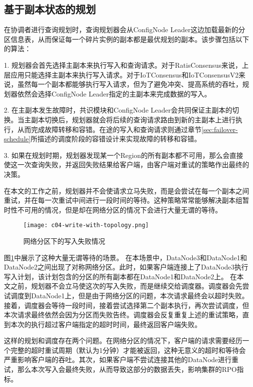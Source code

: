 \subsection{基于副本状态的规划}

在协调者进行查询规划时，查询规划器会从ConfigNode Leader这边加载最新的分区信息表，从而保证每一个碎片实例的副本都是最优规划的副本。该步骤包括以下的算法：

1. 规划器会首先选择主副本来执行写入和查询请求。对于RatisConsensus来说，上层应用只能选择主副本来执行写入请求。对于IoTConsensus和IoTConsensusV2来说，虽然每一个副本都能够执行写入请求，但为了避免冲突、提高系统的吞吐，规划器依然会选择ConfigNode Leader指定的主副本来完成数据的写入。

2. 在主副本发生故障时，共识模块和ConfigNode Leader会共同保证主副本的切换。当主副本切换后，规划器就会将后续的查询请求路由到新的主副本上进行执行，从而完成故障转移和容错。在途的写入和查询请求则通过章节\ref{sec:failover-schedule}所描述的调度阶段的容错设计来实现故障的转移和容错。

3. 如果在规划时期，规划器发现某一个Region的所有副本都不可用，那么会直接使这一次查询失败，并返回失败结果给客户端，由客户端对重试的策略作出最终的决策。

在本文的工作之前，规划器并不会使请求立马失败，而是会尝试在每一个副本之间重试，并在每一次重试中间进行一段时间的等待。这种策略常常能够解决副本组暂时性不可用的情况，但是却在网络分区的情况下会进行大量无谓的等待。

\begin{figure}
  \centering
  \texttt{[image: c04-write-with-topology.png]}
  \caption{网络分区下的写入失败情况}
  \label{fig:c04-write-with-topology}
\end{figure}

图\ref{fig:c04-write-with-topology}中展示了这种大量无谓等待的场景。
在本场景中，DataNode3和DataNode1和DataNode2之间出现了对称网络分区。此时，如果客户端连接上了DataNode3执行写入计划，该计划包含的分区的所有副本都在DataNode1和DataNode2上。
在本文之前，规划器不会立马使这次的写入失败，而是继续交给调度器。调度器会先尝试调度到DataNode1上，但是由于网络分区的问题，本次请求最终会以超时失败。接着，调度器会等待一段时间，接着尝试选择第二个副本执行，再次尝试调度，但本次请求最终依然会因为分区而失败告终。调度器会反复重复上述的重试策略，直到本次的执行超过客户端指定的超时时间，最终返回客户端失败。

这样的规划和调度存在两个问题。在网络分区的情况下，客户端的请求需要经历一个完整的超时重试周期（默认为1分钟）才能被返回，这种无意义的超时和等待会严重影响客户端的吞吐。其次，如果客户端不尝试连接其他的DataNode进行重试，那么本次写入会最终失败，从而导致这部分的数据丢失，影响集群的RPO指标。

